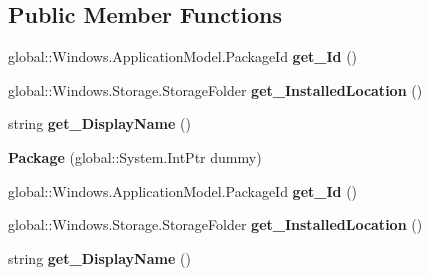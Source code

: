 \subsection*{Public Member Functions}
\begin{DoxyCompactItemize}
\item 
\mbox{\label{class_windows_1_1_application_model_1_1_package_a44c6383bcefe77fa64076b9138ae2b37}} 
global\+::\+Windows.\+Application\+Model.\+Package\+Id {\bfseries get\+\_\+\+Id} ()
\item 
\mbox{\label{class_windows_1_1_application_model_1_1_package_a806299fe1d916b5758d73cd2a9fd49ec}} 
global\+::\+Windows.\+Storage.\+Storage\+Folder {\bfseries get\+\_\+\+Installed\+Location} ()
\item 
\mbox{\label{class_windows_1_1_application_model_1_1_package_a317d75aec1790849c01bb4a23057e36a}} 
string {\bfseries get\+\_\+\+Display\+Name} ()
\item 
\mbox{\label{class_windows_1_1_application_model_1_1_package_a72c00ea4b9b5889235b31657e01833f5}} 
{\bfseries Package} (global\+::\+System.\+Int\+Ptr dummy)
\item 
\mbox{\label{class_windows_1_1_application_model_1_1_package_a44c6383bcefe77fa64076b9138ae2b37}} 
global\+::\+Windows.\+Application\+Model.\+Package\+Id {\bfseries get\+\_\+\+Id} ()
\item 
\mbox{\label{class_windows_1_1_application_model_1_1_package_a806299fe1d916b5758d73cd2a9fd49ec}} 
global\+::\+Windows.\+Storage.\+Storage\+Folder {\bfseries get\+\_\+\+Installed\+Location} ()
\item 
\mbox{\label{class_windows_1_1_application_model_1_1_package_a317d75aec1790849c01bb4a23057e36a}} 
string {\bfseries get\+\_\+\+Display\+Name} ()
\item 
\mbox{\label{class_windows_1_1_application_model_1_1_package_a72c00ea4b9b5889235b31657e01833f5}} 

\end{DoxyCompactItemize}

